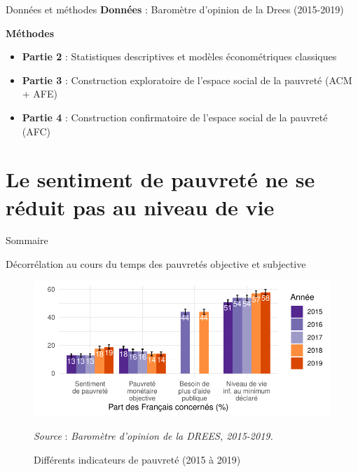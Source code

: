 \documentclass[10pt,xcolor=table,color={dvipsnames,usenames},ignorenonframetext,usepdftitle=false,french]{beamer}
\begin{document}
\begin{frame}{Données et méthodes}
\protect\hypertarget{donnuxe9es-et-muxe9thodes}{}
\textbf{Données} : Baromètre d'opinion de la Drees (2015-2019)

\bigskip

\textbf{Méthodes}

\begin{itemize}
\item
  \textbf{Partie 2} : Statistiques descriptives et modèles
  économétriques classiques
\item
  \textbf{Partie 3} : Construction exploratoire de l'espace social de la
  pauvreté (ACM + AFE)
\item
  \textbf{Partie 4} : Construction confirmatoire de l'espace social de
  la pauvreté (AFC)
\end{itemize}
\end{frame}

\hypertarget{nonreducnv}{%
\section{Le sentiment de pauvreté ne se réduit pas au niveau de
vie}\label{nonreducnv}}

\begin{frame}{Sommaire}
\protect\hypertarget{sommaire-1}{}
\end{frame}

\begin{frame}{Décorrélation au cours du temps des pauvretés objective et
subjective}
\protect\hypertarget{duxe9corruxe9lation-au-cours-du-temps-des-pauvretuxe9s-objective-et-subjective}{}
\begin{figure}[!ht]

{\centering \includegraphics{M2_ANTUNEZ_SQD_ORAL_files/figure-beamer/figchap1compa20152019-1} 

}

\caption[Différents indicateurs de pauvreté (2015 à 2019)]{Différents indicateurs de pauvreté (2015 à 2019)}\label{fig:figchap1compa20152019}

\footnotesize


\emph{Source} : \emph{Baromètre d’opinion de la DREES, 2015-2019.}
\normalsize\end{figure}
\end{frame}
\end{document}
